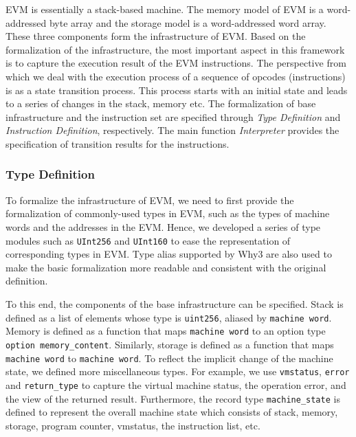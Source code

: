 \documentclass[runningheads]{llncs}
\begin{document}
EVM is essentially a stack-based machine. The memory model of EVM is a word-addressed byte array and
the storage model is a word-addressed word array. These three components form the infrastructure of EVM. 
Based on the formalization of the infrastructure, the most important aspect in this framework is to capture the execution result of the EVM instructions. 
The perspective from which we deal with the execution process of a sequence of opcodes (instructions) is as a state transition process. 
This process starts with an initial state and leads to a series of changes in the stack, memory etc. 
The formalization of base infrastructure and the instruction set are specified through \textit{Type Definition} and \textit{Instruction Definition}, respectively. 
The main function \textit{Interpreter} provides the specification of transition results for the instructions.

\subsubsection{Type Definition}\label{sec:type}

To formalize the infrastructure of EVM, we need to first provide the formalization of commonly-used types in EVM, 
such as the types of machine words and the addresses in the EVM. 
Hence, we developed a series of type modules such as \texttt{UInt256} and \texttt{UInt160} to ease the representation of corresponding types in EVM. 
Type alias supported by Why3 are also used to make the basic formalization more readable and consistent with the original definition. 

To this end, the components of the base infrastructure can be specified. 
Stack is defined as a list of elements whose type is \texttt{uint256}, aliased by \texttt{machine word}. 
Memory is defined as a function that maps \texttt{machine word} to an option type \texttt{option memory\_content}. 
Similarly, storage is defined as a function that maps \texttt{machine word} to \texttt{machine word}. 
To reflect the implicit change of the machine state, we defined more miscellaneous types. 
For example, we use \texttt{vmstatus}, \texttt{error} and \texttt{return\_type} to 
capture the virtual machine status, the operation error, 
and the view of the returned result. 
Furthermore, the record type \texttt{machine\_state} is defined to represent the overall machine state 
which consists of stack, memory, storage, program counter, vmstatus, the instruction list, etc.
\end{document}

